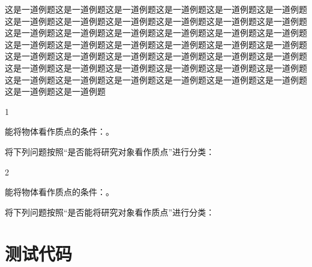 \documentclass[themecolor=vineyard,fontscale=small]{textbook-cn}%
\begin{document}
\begin{Example*}
	这是一道例题这是一道例题这是一道例题这是一道例题这是一道例题这是一道例题这是一道例题这是一道例题这是一道例题这是一道例题这是一道例题这是一道例题这是一道例题这是一道例题这是一道例题这是一道例题这是一道例题这是一道例题这是一道例题这是一道例题这是一道例题这是一道例题这是一道例题这是一道例题这是一道例题这是一道例题这是一道例题这是一道例题这是一道例题这是一道例题这是一道例题这是一道例题这是一道例题这是一道例题这是一道例题这是一道例题这是一道例题这是一道例题这是一道例题这是一道例题这是一道例题这是一道例题这是一道例题这是一道例题
	
	\begin{NumberedItem}{1}
		\item 能将物体看作质点的条件：\underline{\hspace*{7.0cm}}。
		
		\item 将下列问题按照“是否能将研究对象看作质点”进行分类：
		\begin{NumberedItem}{2}
			\item 能将物体看作质点的条件：\underline{\hspace*{7.0cm}}。
			
			\item 将下列问题按照“是否能将研究对象看作质点”进行分类：
		\end{NumberedItem}
	\end{NumberedItem}
	
\end{Example*}








\shorttableofcontents


\tableofcontents*



\mainmatter








\chapter{测试代码}
\end{document}

